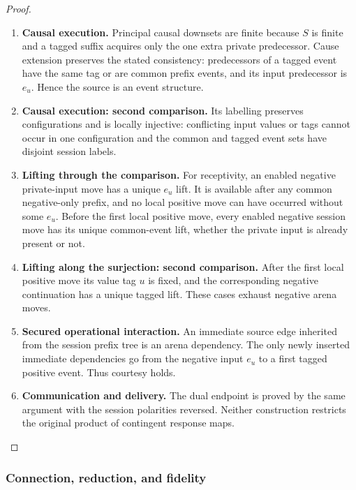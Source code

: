 \documentclass[11pt,a4paper]{article}
\numberwithin{equation}{section}
\theoremstyle{definition}
\theoremstyle{remark}
\theoremstyle{plain}
\begin{document}
\begin{proof}
\leavevmode
\begin{enumerate}[label=\textup{(\arabic*)},leftmargin=*,itemsep=4pt,topsep=3pt]
  \item \textbf{Causal execution.} Principal causal downsets are finite because $S$ is finite and a tagged
suffix acquires only the one extra private predecessor. Cause extension
preserves the stated consistency: predecessors of a tagged event have
the same tag or are common prefix events, and its input predecessor is
$e_u$. Hence the source is an event structure.
  \item \textbf{Causal execution: second comparison.} Its labelling preserves
configurations and is locally injective: conflicting input values or
tags cannot occur in one configuration and the common and tagged event
sets have disjoint session labels.
  \item \textbf{Lifting through the comparison.} For receptivity, an enabled negative private-input move has a unique
$e_u$ lift. It is available after any common negative-only prefix,
and no local positive move can have occurred without some $e_u$. Before the first local positive move, every enabled negative session
move has its unique common-event lift, whether the private input is
already present or not.
  \item \textbf{Lifting along the surjection: second comparison.} After the first local positive move its value
tag $u$ is fixed, and the corresponding negative continuation has a
unique tagged lift. These cases exhaust negative arena moves.
  \item \textbf{Secured operational interaction.} An immediate source edge inherited from the session prefix tree is an
arena dependency. The only newly inserted immediate dependencies go
from the negative input $e_u$ to a first tagged positive event. Thus
courtesy holds.
  \item \textbf{Communication and delivery.} The dual endpoint is proved by the same argument with
the session polarities reversed. Neither construction restricts the
original product of contingent response maps.
\end{enumerate}
\end{proof}


\subsubsection{Connection, reduction, and fidelity}
\end{document}
